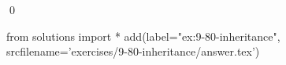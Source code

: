 
\begin{ex}
  \label{ex:9-80-inheritance}
  
  \qed
\end{ex}
\begin{python0}
from solutions import *
add(label="ex:9-80-inheritance",
    srcfilename='exercises/9-80-inheritance/answer.tex')
\end{python0}
